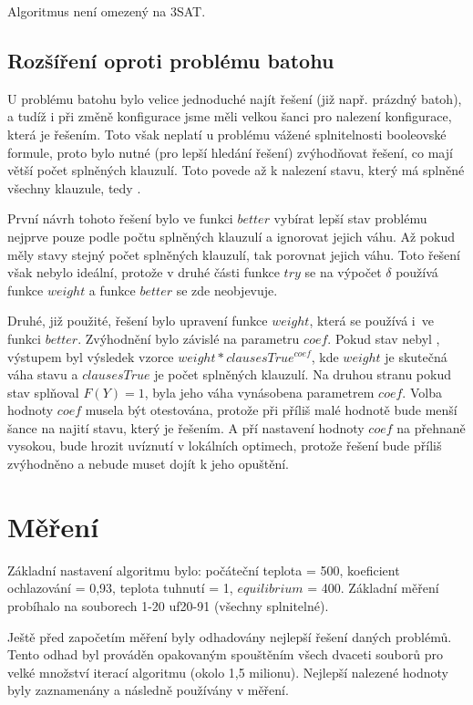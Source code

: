\documentclass[10pt,a4paper]{article}
\begin{document}
Algoritmus není omezený na 3SAT.

\subsection{Rozšíření oproti problému batohu}
U problému batohu bylo velice jednoduché najít řešení (již např. prázdný batoh), a tudíž i při změně konfigurace jsme měli velkou šanci pro nalezení konfigurace, která je řešením. Toto však neplatí u problému vážené splnitelnosti booleovské formule, proto bylo nutné (pro lepší hledání řešení) zvýhodňovat řešení, co mají větší počet splněných klauzulí. Toto povede až k nalezení stavu, který má splněné všechny klauzule, tedy .

První návrh tohoto řešení bylo ve funkci $better$ vybírat lepší stav problému nejprve pouze podle počtu splněných klauzulí a ignorovat jejich váhu. Až pokud měly stavy stejný počet splněných klauzulí, tak porovnat jejich váhu. Toto řešení však nebylo ideální, protože v druhé části funkce $try$ se na výpočet $\delta$ používá funkce $weight$ a funkce $better$ se zde neobjevuje.

Druhé, již použité, řešení bylo upravení funkce $weight$, která se používá i~ve funkci $better$. Zvýhodnění bylo závislé na parametru $coef$. Pokud stav nebyl , výstupem byl výsledek vzorce $weight*clausesTrue^{coef}$, kde $weight$ je skutečná váha stavu a $clausesTrue$ je počet splněných klauzulí. Na druhou stranu pokud stav splňoval $F(Y)=1$, byla jeho váha vynásobena parametrem $coef$. Volba hodnoty $coef$ musela být otestována, protože při příliš malé hodnotě bude menší šance na najití stavu, který je řešením. A pří nastavení hodnoty $coef$ na přehnaně vysokou, bude hrozit uvíznutí v lokálních optimech, protože řešení  bude příliš zvýhodněno a nebude muset dojít k jeho opuštění.

\section{Měření}
Základní nastavení algoritmu bylo: počáteční teplota = 500, koeficient ochlazování = 0,93, teplota tuhnutí = 1, $equilibrium$ = 400. Základní měření probíhalo na souborech 1-20 uf20-91 (všechny splnitelné). 

Ještě před započetím měření byly odhadovány nejlepší řešení daných problémů. Tento odhad byl prováděn opakovaným spouštěním všech dvaceti souborů pro velké množství iterací algoritmu (okolo 1,5 milionu). Nejlepší nalezené hodnoty byly zaznamenány a následně používány v měření.
\end{document}

